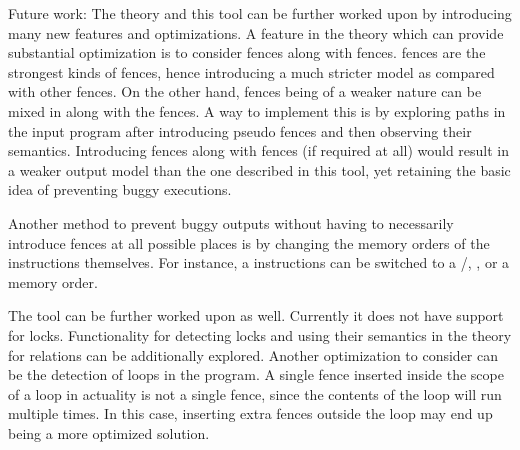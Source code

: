 Future work:
The theory and this tool can be further worked upon
by introducing many new features and optimizations. A feature in the
theory which can provide substantial optimization is to consider
\moar fences along with \mosc fences. \mosc fences are the strongest 
kinds of fences, hence introducing a much stricter model as compared with
other fences. On the other hand, \moar fences
being of a weaker nature can be mixed in along with the \mosc
fences. A way to implement this is by exploring \setSW 
paths in the input program after introducing
pseudo fences and then observing their semantics. Introducing \moar fences
along with \mosc fences (if required at all) would result in a
weaker output model than the one described in this tool, yet retaining
the basic idea of preventing buggy executions.

Another method to prevent buggy outputs without having to necessarily
introduce \mosc fences at all possible places is by changing the 
memory orders of the instructions themselves. For instance, a \morlx 
instructions can be switched to a \morel/\moacq, \moar, or a \mosc memory order.

The tool can be further worked upon as well. Currently it does not have support
for locks. Functionality for detecting locks and using their semantics
in the theory for \setTO relations can be additionally explored. Another optimization
to consider can be the detection of loops in the program. A single fence
inserted inside the scope of a loop in actuality is not a single fence, since
the contents of the loop will run multiple times. In this case, inserting extra fences
outside the loop may end up being a more optimized solution.